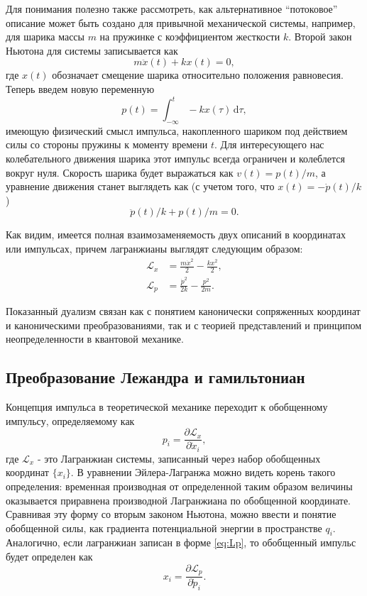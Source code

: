 \documentclass[14pt, a4paper]{extreport}
\newcommand{\diff}{\,\mathrm{d}}
\numberwithin{equation}{section}
\begin{document}
Для понимания полезно также рассмотреть, как альтернативное ``потоковое'' описание может быть создано для привычной механической системы, например, для шарика массы $m$ на пружинке с коэффициентом жесткости $k$. Второй закон Ньютона для системы записывается как
\begin{equation}
	m \ddot x(t) + k x(t) = 0,
\end{equation}
где $x(t)$ обозначает смещение шарика относительно положения равновесия. Теперь введем новую переменную
\begin{equation}
	p(t) = \int_{-\infty}^{t} - k x(\tau) \diff \tau,
\end{equation}
имеющую физический смысл импульса, накопленного шариком под действием силы со стороны пружины к моменту времени $ t $. Для интересующего нас колебательного движения шарика этот импульс всегда ограничен и колеблется вокруг нуля. Скорость шарика будет выражаться как $v(t) = p(t)/m$, а уравнение движения станет выглядеть как (с учетом того, что $ x(t) = - \dot p(t) / k $)
\begin{equation}
	\ddot p(t)/k + p(t)/m = 0.
\end{equation}

Как видим, имеется полная взаимозаменяемость двух описаний в координатах или импульсах, причем лагранжианы выглядят следующим образом:
\begin{align}
\mathcal{L}_x &= \frac{m \dot x^2}{2} - \frac{k x^2}{2},\\
\mathcal{L}_p &= \frac{\dot p^2}{2 k} - \frac{p^2}{2 m}.\label{eq:Lp}
\end{align}

Показанный дуализм связан как с понятием канонически сопряженных координат и каноническими преобразованиями, так и с теорией представлений и принципом неопределенности в квантовой механике.

\subsection{Преобразование Лежандра и гамильтониан}

Концепция импульса в теоретической механике переходит к обобщенному импульсу, определяемому как 
\begin{equation}
	p_i = \frac{\partial \mathcal{L}_x}{\partial \dot x_i},
\end{equation}
где $ \mathcal{L}_x $ - это Лагранжиан системы, записанный через набор обобщенных координат $\{x_i\}$. В уравнении Эйлера-Лагранжа можно видеть корень такого определения: временная производная от определенной таким образом величины оказывается приравнена производной Лагранжиана по обобщенной координате. Сравнивая эту форму со вторым законом Ньютона, можно ввести и понятие обобщенной силы, как градиента потенциальной энергии в пространстве $q_i$. Аналогично, если лагранжиан записан в форме \eqref{eq:Lp}, то обобщенный импульс будет определен как
\begin{equation}
x_i = \frac{\partial \mathcal{L}_p}{\partial \dot p_i}.
\end{equation}
\end{document}
